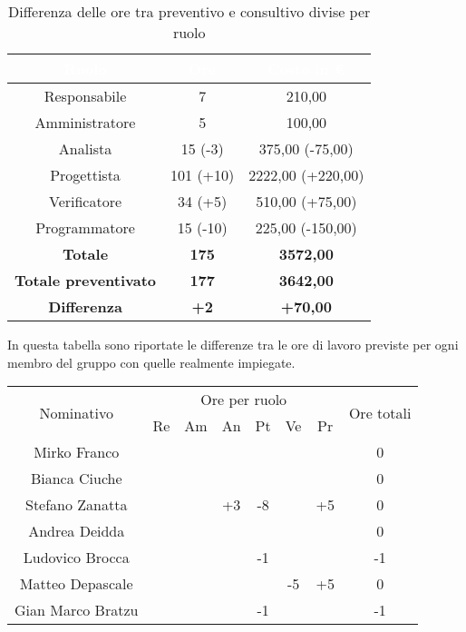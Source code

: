 \begin{flushleft}
	\begin{table}[ht]
	\begin{center}
		\begin{tabular}{ccc}
			\rowcolor{coolblack}
			\hline
			\textcolor{white}{Ruolo} & \textcolor{white}{Ore} & \textcolor{white}{Costo in \euro}\\
			\hline
			Responsabile   & 7   		&  210,00  			 	\\ 
			Amministratore & 5   		&  100,00 			 	\\ 
			Analista       & 15 (-3)  	&  375,00 (-75,00)   	\\ 
			Progettista    & 101 (+10)	&  2222,00 (+220,00) 	\\ 
			Verificatore   & 34 (+5)  	&  510,00 (+75,00) 		\\ 
			Programmatore  & 15 (-10)   &  225,00 (-150,00) 	\\ \hline
			\textbf{Totale}& \textbf{175} & \textbf{3572,00}	\\ \hline 
			\textbf{Totale preventivato}& \textbf{177} & \textbf{3642,00}\\ \hline 
			\textbf{Differenza}& \textbf{+2} & \textbf{+70,00 }	\\ \hline  
		\end{tabular}
		
		\caption{Differenza delle ore tra preventivo e consultivo divise per ruolo} 
	\end{center}
\end{table}
  
  In questa tabella  sono riportate le differenze tra le ore di lavoro previste per ogni membro del gruppo con quelle realmente impiegate.\\
  
    \begin{table}[ht]
  	\begin{center}
    \begin{tabularx}{\textwidth}{|c|cccccc|c|}
  			
  	\hline
  	\multirow{2}{*}{Nominativo} & \multicolumn{6}{c|}{Ore per ruolo} & \multirow{2}{*}{Ore totali} \\ \cline{2-7}
  					  & Re & Am & An & Pt & Ve & Pr &      \\ \hline
  	\endhead
  	Mirko Franco       &   &    &    &    &  &   & 0        \\ \hline
  	Bianca Ciuche      &   &    &    &    &  &   & 0        \\ \hline
  	Stefano Zanatta    &   &    & +3 & -8 &   & +5  & 0        \\ \hline
  	Andrea Deidda      &   &  &   &   &   &   & 0  		\\ \hline
  	Ludovico Brocca    &   &  &   & -1  &  &   & -1        \\ \hline
  	Matteo Depascale   &   &  &   &   & -5  & +5  & 0  		\\ \hline
  	Gian Marco Bratzu  &   &  &   & -1  &  &   & -1        \\ \hline
    

\end{tabularx}
\end{center}
\end{table}
\end{flushleft}
